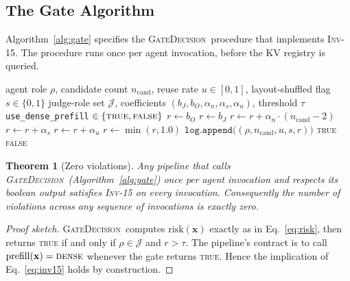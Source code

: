 \documentclass[10pt,twocolumn]{article}
\newcommand{\INV}[1]{\textsc{Inv-#1}}
\newcommand{\Risk}{\mathrm{risk}}
\newcommand{\Judge}{\mathcal{J}}
\newcommand{\Cand}{n_{\text{cand}}}
\newcommand{\Reuse}{u}
\newcommand{\Shuf}{s}
\newcommand{\GateDecision}{\textsc{GateDecision}}
\newtheorem{theorem}{Theorem}
\begin{document}
\subsection{The Gate Algorithm}
\label{sec:invariant:algo}

Algorithm~\ref{alg:gate} specifies the \GateDecision\ procedure that
implements \INV{15}. The procedure runs once per agent invocation, before
the KV registry is queried.

\begin{algorithm*}[t]
\caption{\GateDecision: \INV{15}-enforcing preflight. A \textsc{true}
         return value signals that the invariant fires and the agent
         must use dense prefill. Cost is $O(1)$ per call.}
\label{alg:gate}
\begin{algorithmic}[1]
\Require agent role $\rho$, candidate count $\Cand$, reuse rate
         $\Reuse \in [0,1]$, layout-shuffled flag $\Shuf \in \{0,1\}$
\Require judge-role set $\Judge$, coefficients
         $(b_J, b_O, \alpha_n, \alpha_s, \alpha_u)$, threshold $\tau$
\Ensure \texttt{use\_dense\_prefill} $\in \{\textsc{true}, \textsc{false}\}$
\State $r \gets b_O$
\If{$\rho \in \Judge$} $r \gets b_J$ \EndIf
\If{$\Cand > 2$} $r \gets r + \alpha_n \cdot (\Cand - 2)$ \EndIf
\If{$\Shuf = 1$} $r \gets r + \alpha_s$ \EndIf
\If{$\Reuse > 0.8$} $r \gets r + \alpha_u$ \EndIf
\State $r \gets \min(r, 1.0)$
\State $\texttt{log.append}\big((\rho, \Cand, \Reuse, \Shuf, r)\big)$
\If{$\rho \in \Judge$ \textbf{and} $r > \tau$}
  \State \Return \textsc{true}
\Else
  \State \Return \textsc{false}
\EndIf
\end{algorithmic}
\end{algorithm*}

\begin{theorem}[Zero violations]
\label{thm:zero}
Any pipeline that calls \GateDecision\ (Algorithm~\ref{alg:gate}) once per
agent invocation and respects its boolean output satisfies \INV{15} on
every invocation. Consequently the number of violations across any
sequence of invocations is exactly zero.
\end{theorem}

\begin{proof}[Proof sketch]
\GateDecision\ computes $\Risk(\mathbf{x})$ exactly as in
Eq.~\ref{eq:risk}, then returns \textsc{true} if and only if
$\rho \in \Judge$ and $r > \tau$. The pipeline's contract is to call
$\mathrm{prefill}(\mathbf{x}) = \textsc{dense}$ whenever the gate returns
\textsc{true}. Hence the implication of Eq.~\ref{eq:inv15} holds by
construction.
\end{proof}
\end{document}
